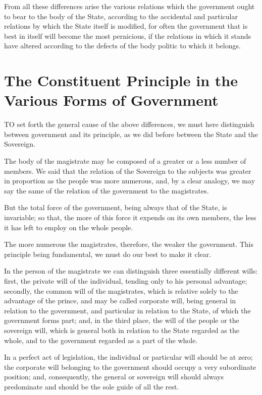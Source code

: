 \documentclass[12pt]{book}
\begin{document}
From all these differences arise the various relations which the government ought to bear to the body of the State, according to the accidental and particular relations by which the State itself is modified, for often the government that is best in itself will become the most pernicious, if the relations in which it stands have altered according to the defects of the body politic to which it belongs.

\section{The Constituent Principle in the Various Forms of Government}
TO set forth the general cause of the above differences, we must here distinguish between government and its principle, as we did before between the State and the Sovereign.

The body of the magistrate may be composed of a greater or a less number of members. We said that the relation of the Sovereign to the subjects was greater in proportion as the people was more numerous, and, by a clear analogy, we may say the same of the relation of the government to the magistrates.

But the total force of the government, being always that of the State, is invariable; so that, the more of this force it expends on its own members, the less it has left to employ on the whole people.

The more numerous the magistrates, therefore, the weaker the government. This principle being fundamental, we must do our best to make it clear.

In the person of the magistrate we can distinguish three essentially different wills: first, the private will of the individual, tending only to his personal advantage; secondly, the common will of the magistrates, which is relative solely to the advantage of the prince, and may be called corporate will, being general in relation to the government, and particular in relation to the State, of which the government forms part; and, in the third place, the will of the people or the sovereign will, which is general both in relation to the State regarded as the whole, and to the government regarded as a part of the whole.

In a perfect act of legislation, the individual or particular will should be at zero; the corporate will belonging to the government should occupy a very subordinate position; and, consequently, the general or sovereign will should always predominate and should be the sole guide of all the rest.
\end{document}
